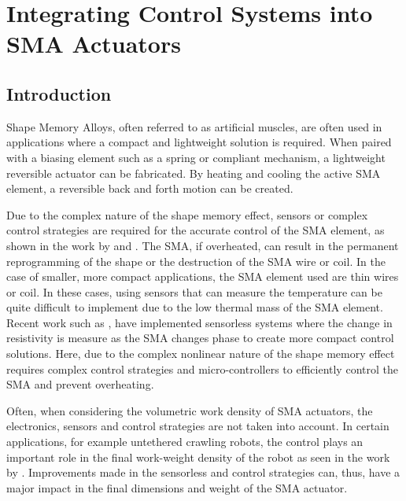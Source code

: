 
\chapter{Integrating Control Systems into SMA Actuators}


\section{Introduction}
Shape Memory Alloys, often referred to as artificial muscles, are often used in applications where a compact and lightweight solution is required. When paired with a biasing element such as a spring or compliant mechanism, a lightweight reversible actuator can be fabricated. By heating and cooling the active SMA element, a reversible back and forth motion can be created.

Due to the complex nature of the shape memory effect, sensors or complex control strategies are required for the accurate control of the SMA element, as shown in the work by \todocite and \todocite. The SMA, if overheated, can result in the permanent reprogramming of the shape or the destruction of the SMA wire or coil. In the case of smaller, more compact applications, the SMA element used are thin wires or coil. In these cases, using sensors that can measure the temperature can be quite difficult to implement due to the low thermal mass of the SMA element. Recent work such as \todocite, have implemented sensorless systems where the change in resistivity is measure as the SMA changes phase to create more compact control solutions. Here, due to the complex nonlinear nature of the shape memory effect requires complex control strategies and micro-controllers to efficiently control the SMA and prevent overheating.

Often, when considering the volumetric work density of SMA actuators, the electronics, sensors and control strategies are not taken into account. In certain applications, for example untethered crawling robots, the control plays an important role in the final work-weight density of the robot as seen in the work by \todocite. Improvements made in the sensorless and control strategies can, thus, have a major impact in the final dimensions and weight of the SMA actuator.

